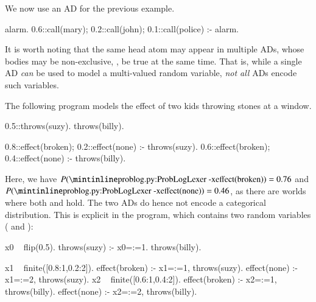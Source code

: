 \begin{example}
    We now use an AD for the previous example.
    \begin{problog}
alarm.
0.6::call(mary); 0.2::call(john); 0.1::call(police) :- alarm.
    \end{problog}
\end{example}

It is worth noting that the same head atom may appear in multiple ADs, whose bodies may be non-exclusive, \ie, be true at the same time. That is, while a single AD \emph{can} be used to model a multi-valued random variable, \emph{not all} ADs  encode such variables.
\begin{example}
    The following program models the effect of two kids throwing stones at a window.
    \begin{problog}
0.5::throws(suzy).
throws(billy).

0.8::effect(broken); 0.2::effect(none) :- throws(suzy).
0.6::effect(broken); 0.4::effect(none) :- throws(billy).
    \end{problog}
    Here, we have $P(\text{\probloginline{effect(broken)}})=0.76$ and $P(\text{\probloginline{effect(none)}})=0.46$, as there are worlds where both  and  hold. The two ADs do hence not encode a categorical distribution.
    This is explicit in the \dfplpsty program, which contains two  random variables ( and ):
    \begin{problog}
x0 ~ flip(0.5).
throws(suzy) :- x0=:=1.
throws(billy).

x1 ~ finite([0.8:1,0.2:2]).
effect(broken) :- x1=:=1, throws(suzy).
effect(none) :- x1=:=2, throws(suzy).
x2 ~ finite([0.6:1,0.4:2]).
effect(broken) :- x2=:=1, throws(billy).
effect(none) :- x2=:=2, throws(billy).
    \end{problog}


\end{example}






